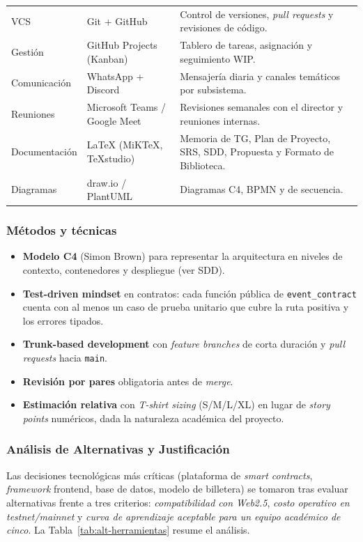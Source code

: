 \documentclass[12pt,oneside]{report}
\begin{document}
\begin{longtable}{@{}p{3.3cm} p{4.0cm} p{7.5cm}@{}}
        VCS & Git + GitHub & Control de versiones, \textit{pull requests} y revisiones de código.\\
        Gestión & GitHub Projects (Kanban) & Tablero de tareas, asignación y seguimiento WIP.\\
        Comunicación & WhatsApp + Discord & Mensajería diaria y canales temáticos por subsistema.\\
        Reuniones & Microsoft Teams / Google Meet & Revisiones semanales con el director y reuniones internas.\\
        Documentación & \LaTeX{} (MiKTeX, TeXstudio) & Memoria de TG, Plan de Proyecto, SRS, SDD, Propuesta y Formato de Biblioteca.\\
        Diagramas & draw.io / PlantUML & Diagramas C4, BPMN y de secuencia.\\
      \end{longtable}

      \subsubsection{Métodos y técnicas}
      \begin{itemize}
        \item \textbf{Modelo C4} (Simon Brown) para representar la arquitectura en niveles de contexto, contenedores y despliegue (ver SDD).
        \item \textbf{Test-driven mindset} en contratos: cada función pública de \texttt{event\_contract} cuenta con al menos un caso de prueba unitario que cubre la ruta positiva y los errores tipados.
        \item \textbf{Trunk-based development} con \textit{feature branches} de corta duración y \textit{pull requests} hacia \texttt{main}.
        \item \textbf{Revisión por pares} obligatoria antes de \textit{merge}.
        \item \textbf{Estimación relativa} con \textit{T-shirt sizing} (S/M/L/XL) en lugar de \textit{story points} numéricos, dada la naturaleza académica del proyecto.
      \end{itemize}

      \subsubsection{Análisis de Alternativas y Justificación}
      \label{subsubsec:analisis-herramientas}

      Las decisiones tecnológicas más críticas (plataforma de \textit{smart contracts}, \textit{framework} frontend, base de datos, modelo de billetera) se tomaron tras evaluar alternativas frente a tres criterios: \emph{compatibilidad con Web2.5}, \emph{costo operativo en testnet/mainnet} y \emph{curva de aprendizaje aceptable para un equipo académico de cinco}. La Tabla~\ref{tab:alt-herramientas} resume el análisis.
\end{document}
